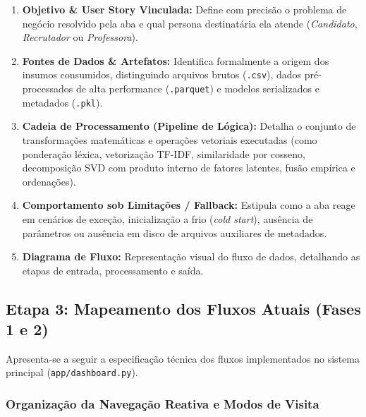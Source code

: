 \begin{enumerate}[label=\textbf{\arabic*.}]
    \item \textbf{Objetivo \& User Story Vinculada:} Define com precisão o problema de negócio resolvido pela aba e qual persona destinatária ela atende (\textit{Candidato}, \textit{Recrutador} ou \textit{Professora}).
    \item \textbf{Fontes de Dados \& Artefatos:} Identifica formalmente a origem dos insumos consumidos, distinguindo arquivos brutos (\texttt{.csv}), dados pré-processados de alta performance (\texttt{.parquet}) e modelos serializados e metadados (\texttt{.pkl}).
    \item \textbf{Cadeia de Processamento (Pipeline de Lógica):} Detalha o conjunto de transformações matemáticas e operações vetoriais executadas (como ponderação léxica, vetorização TF-IDF, similaridade por cosseno, decomposição SVD com produto interno de fatores latentes, fusão empírica e ordenações).
    \item \textbf{Comportamento sob Limitações / Fallback:} Estipula como a aba reage em cenários de exceção, inicialização a frio (\textit{cold start}), ausência de parâmetros ou ausência em disco de arquivos auxiliares de metadados.
    \item \textbf{Diagrama de Fluxo:} Representação visual do fluxo de dados, detalhando as etapas de entrada, processamento e saída.
\end{enumerate}

\subsection{Etapa 3: Mapeamento dos Fluxos Atuais (Fases 1 e 2)}

Apresenta-se a seguir a especificação técnica dos fluxos implementados no sistema principal (\texttt{app/dashboard.py}). 

\subsubsection{Organização da Navegação Reativa e Modos de Visita}

